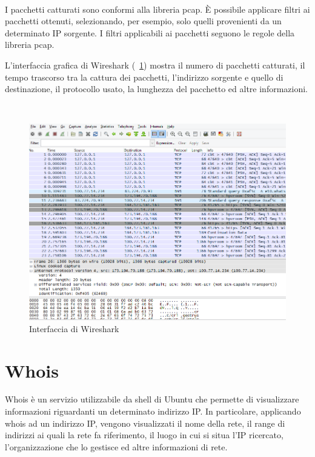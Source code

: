 \documentclass[a4paper,11pt]{book}
\begin{document}
~

I pacchetti catturati sono conformi alla libreria pcap. \`E possibile applicare filtri ai pacchetti ottenuti, selezionando, per esempio, solo quelli provenienti da un determinato IP sorgente. I filtri applicabili ai pacchetti seguono le regole della libreria pcap.

L'interfaccia grafica di Wireshark (\figurename ~\ref{fig:Whireshark}) mostra il numero di pacchetti catturati, il tempo trascorso tra la cattura dei pacchetti, l'indirizzo sorgente e quello di destinazione, il protocollo usato, la lunghezza del pacchetto ed altre informazioni.

~

\begin{figure}[!ht]
\centering
\includegraphics[scale = 0.5]{Whireshark}
\caption{Interfaccia di Wireshark}
\label{fig:Whireshark}
\end{figure}

\clearpage

\section{Whois}
Whois \`e un servizio utilizzabile da shell di Ubuntu che permette di visualizzare informazioni riguardanti un determinato indirizzo IP.
In particolare, applicando whois ad un indirizzo IP, vengono visualizzati il nome della rete, il range di indirizzi ai quali la rete fa riferimento, il luogo in cui si situa l'IP ricercato, l'organizzazione che lo gestisce ed altre informazioni di rete.

~
\end{document}
